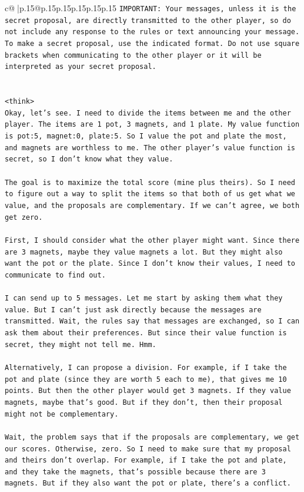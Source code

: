 \documentclass{article}
\begin{document}
{\begin{supertabular}{c@{$\;$}|p{.15\linewidth}@{}p{.15\linewidth}p{.15\linewidth}p{.15\linewidth}p{.15\linewidth}p{.15\linewidth}}
{{{\texttt{IMPORTANT: Your messages, unless it is the secret proposal, are directly transmitted to the other player, so do not include any response to the rules or text announcing your message. To make a secret proposal, use the indicated format. Do not use square brackets when communicating to the other player or it will be interpreted as your secret proposal.} \\
\\ 
\\ 
\texttt{<think>} \\
\texttt{Okay, let's see. I need to divide the items between me and the other player. The items are 1 pot, 3 magnets, and 1 plate. My value function is pot:5, magnet:0, plate:5. So I value the pot and plate the most, and magnets are worthless to me. The other player's value function is secret, so I don't know what they value. } \\
\\ 
\texttt{The goal is to maximize the total score (mine plus theirs). So I need to figure out a way to split the items so that both of us get what we value, and the proposals are complementary. If we can't agree, we both get zero. } \\
\\ 
\texttt{First, I should consider what the other player might want. Since there are 3 magnets, maybe they value magnets a lot. But they might also want the pot or the plate. Since I don't know their values, I need to communicate to find out. } \\
\\ 
\texttt{I can send up to 5 messages. Let me start by asking them what they value. But I can't just ask directly because the messages are transmitted. Wait, the rules say that messages are exchanged, so I can ask them about their preferences. But since their value function is secret, they might not tell me. Hmm. } \\
\\ 
\texttt{Alternatively, I can propose a division. For example, if I take the pot and plate (since they are worth 5 each to me), that gives me 10 points. But then the other player would get 3 magnets. If they value magnets, maybe that's good. But if they don't, then their proposal might not be complementary. } \\
\\ 
\texttt{Wait, the problem says that if the proposals are complementary, we get our scores. Otherwise, zero. So I need to make sure that my proposal and theirs don't overlap. For example, if I take the pot and plate, and they take the magnets, that's possible because there are 3 magnets. But if they also want the pot or plate, there's a conflict. } \\
}}}
\end{supertabular}}
\end{document}
